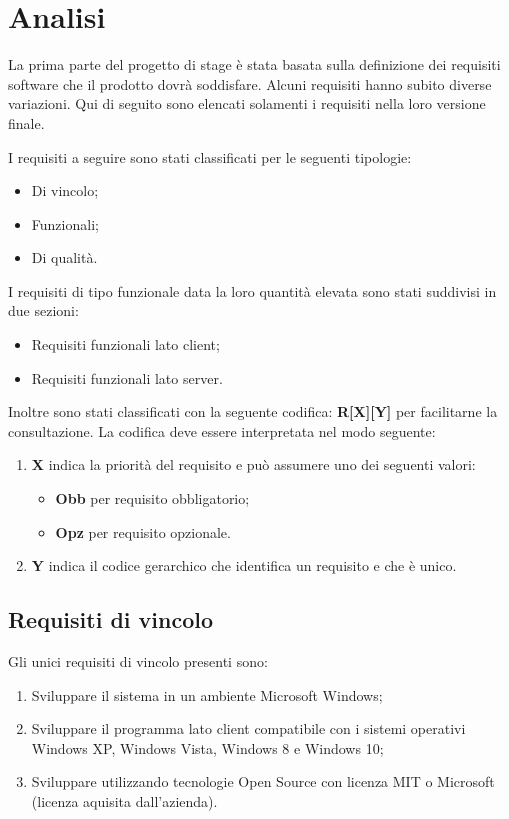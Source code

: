 \documentclass[../RelazioneFinale]{subfiles}
\begin{document}
	\chapter{Analisi}
	\label{cap:Requisiti}
		La prima parte del progetto di stage è stata basata sulla definizione dei requisiti software che il prodotto dovrà soddisfare. Alcuni requisiti hanno subito diverse variazioni. Qui di seguito sono elencati solamenti i requisiti nella loro versione finale.

		I requisiti a seguire sono stati classificati per le seguenti tipologie:
		\begin{itemize}
			\item Di vincolo;
			\item Funzionali;
			\item Di qualità.
		\end{itemize}
		I requisiti di tipo funzionale data la loro quantità elevata sono stati suddivisi in due sezioni:
		\begin{itemize}
			\item Requisiti funzionali lato client;
			\item Requisiti funzionali lato server.
		\end{itemize}		
		Inoltre sono stati classificati con la seguente codifica: \textbf{R[X][Y]} per facilitarne la consultazione. La codifica deve essere interpretata nel modo seguente:
		\begin{enumerate}
			\item \textbf{X} indica la priorità del requisito e può assumere uno dei seguenti valori:
			\begin{itemize}
				\item \textbf{Obb} per requisito obbligatorio;
				\item \textbf{Opz} per requisito opzionale.
			\end{itemize}
			\item \textbf{Y} indica il codice gerarchico che identifica un requisito e che è unico.
		\end{enumerate}	

		\section{Requisiti di vincolo}
			Gli unici requisiti di vincolo presenti sono:
			\begin{enumerate}
				\item Sviluppare il sistema in un ambiente Microsoft Windows;
				\item Sviluppare il programma lato client compatibile con i sistemi operativi Windows XP, Windows Vista, Windows 8 e Windows 10;
				\item Sviluppare utilizzando tecnologie Open Source con licenza MIT o Microsoft (licenza aquisita dall'azienda).
			\end{enumerate}
		
\end{document}
